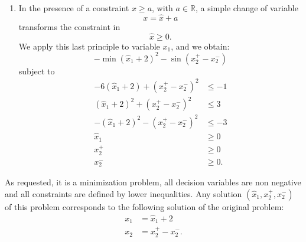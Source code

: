 \begin{enumerate}
$$-\min x_1^2-\sin(x_2^+-x_2^-)$$
subject to
\begin{align*}
-6x_1 +(x_2^+-x_2^-)^2  & \leq -1\\
x_1^2 +(x_2^+-x_2^-)^2  & \leq 3\\
-x_1^2 -(x_2^+-x_2^-)^2  & \leq -3\\
x_1 & \geq 2\\
x_2^+ & \geq 0\\
x_2^- & \geq 0.
\end{align*}

\item In the presence of a constraint $x\geq a$, with $a \in \mathbb{R}$, a simple change of variable
$$
x=  \hat{x}+a$$
transforms the constraint in
$$\hat{x}\geq  0.$$
We apply this last principle to variable $x_1$, and we obtain:
$$
-\min(\hat{x}_1+2)^2- \sin(x_2^+-x_2^-)
$$
subject to
\begin{align*}
-6(\hat{x}_1+2)+(x_2^+-x_2^-)^2  & \leq -1\\
(\hat{x}_1+2)^2+(x_2^+-x_2^-)^2 & \leq 3\\
-(\hat{x}_1+2)^2-(x_2^+-x_2^-)^2 &\leq -3\\
\hat{x}_1 & \geq 0\\
x_2^+ & \geq 0\\
x_2^- & \geq 0.
\end{align*}
\end{enumerate}

As requested, it is a minimization problem, all decision variables are non negative and all
constraints are defined by lower inequalities. Any solution
$(\hat{x}_1,x_2^+,x_2^-)$ of this
problem corresponds to the following solution of the original problem:
\[
\begin{aligned}
  x_1 &= \hat{x}_1 + 2 \\
  x_2 &= x_2^+ - x_2^-.
\end{aligned}
\]






